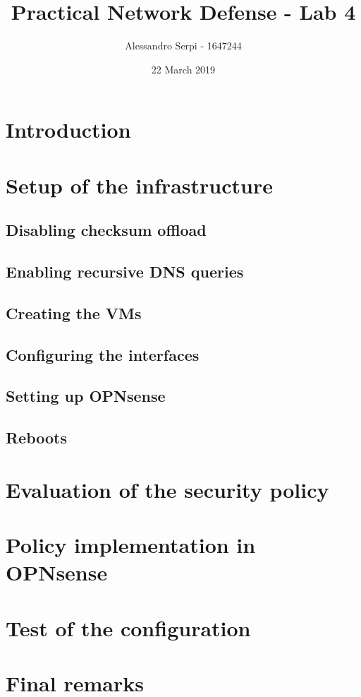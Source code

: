 \documentclass[draft]{homework}
\title{Practical Network Defense - Lab 4}
\author{Alessandro Serpi - 1647244}
\date{22 March 2019}
\newcommand{\opn}{OPNsense\xspace}
\begin{document}
    \maketitle
    \tableofcontents
    
    
    \section{Introduction}
    
    
    \section{Setup of the infrastructure}
    \subsection{Disabling checksum offload}
    
    \subsection{Enabling recursive DNS queries}
    
    \subsection{Creating the VMs}
    
    \subsection{Configuring the interfaces}
    
    \subsection{Setting up \opn}
    
    \subsection{Reboots}
    
    
    \section{Evaluation of the security policy}
    
    
    \section{Policy implementation in \opn}
    
    
    \section{Test of the configuration}
    
    \section{Final remarks}
\end{document}
